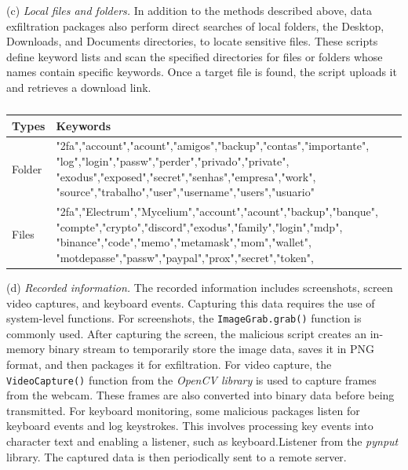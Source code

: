 (c) \textit{Local files and folders.} In addition to the methods described above,  data exfiltration packages also perform direct searches of local folders,  the Desktop, Downloads, and Documents directories, to locate sensitive files. These scripts define keyword lists and scan the specified directories for files or folders whose names contain specific keywords.  Once a target file is found, the script uploads it and retrieves a download link.

\begin{table}[!t]
    \centering
    \footnotesize
    \caption{}
    \label{keywords}
    \vspace{-10pt}
    \begin{tabular}{|p{1.0cm}|p{9cm}|}   \hline
    Types & Keywords \\  \hline
    Folder & "2fa","account","acount","amigos","backup","contas","importante",\newline
             "log","login","passw","perder","privado","private",\newline
             "exodus","exposed","secret","senhas","empresa","work", \newline
             "source","trabalho","user","username","users","usuario"  \\ \hline
    Files  & "2fa","Electrum","Mycelium","account","acount","backup","banque",\newline
             "compte","crypto","discord","exodus","family","login","mdp",\newline
             "binance","code","memo","metamask","mom","wallet",\newline
             "motdepasse","passw","paypal","prox","secret","token",  \\\hline
    \end{tabular}
\end{table}


(d) \textit{Recorded information.} The recorded information includes screenshots, screen video captures, and keyboard events.  Capturing this data requires the use of system-level functions. For screenshots, the \texttt{ImageGrab.grab()} function is commonly used. After capturing the screen, the malicious script creates an in-memory binary stream to temporarily store the image data, saves it in PNG format, and then packages it for exfiltration. For video capture, the \texttt{VideoCapture()} function from the \textit{OpenCV library} is used to capture frames from the webcam. These frames are also converted into binary data before being transmitted. For keyboard monitoring, some malicious packages listen for keyboard events and log keystrokes. This involves processing key events into character text and enabling a listener, such as keyboard.Listener from the \textit{pynput} library. The captured data is then periodically sent to a remote server.

